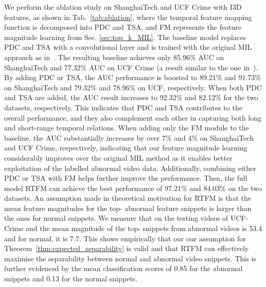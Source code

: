 \documentclass[final]{cvpr}
\begin{document}
We perform the ablation study on ShanghaiTech and UCF Crime with I3D features, as shown in Tab.~\ref{tab:ablation}, where the temporal feature mapping function  is decomposed into PDC and TSA, and FM represents the feature magnitude learning from Sec. \ref{sec:top_k_MIL}. 
The baseline model
replaces PDC and TSA with a  convolutional layer and is trained with the original MIL approach as in~\cite{sultani2018real}. The resulting baseline achieves only 85.96\% AUC on ShanghaiTech and 77.32\% AUC on UCF Crime (a result similar to the one in~\cite{sultani2018real}).
By adding PDC or TSA, the AUC performance is boosted to 89.21\% and 91.73\% on ShanghaiTech and 79.32\% and 78.96\% on UCF, respectively. When both PDC and TSA are added, the AUC result increases to 92.32\% and 82.12\% for the two datasets, respectively. This indicates that PDC and TSA contributes to the overall performance, and they also complement each other in capturing both long and short-range temporal relations.
When adding only the FM module to the baseline, the AUC substantially increases by over 7\% and 4\% on ShanghaiTech and UCF Crime, respectively, indicating that our feature magnitude learning considerably improves over the original MIL method as it enables better exploitation of the labelled abnormal video data. Additionally, combining either PDC or TSA with FM helps further improve the performance. Then, the full model RTFM can achieve the best performance of 97.21\% and 84.03\% on the two datasets.  
An assumption made in theoretical motivation for RTFM is that the mean feature magnitudes for the top- abnormal feature snippets is larger than the ones for normal snippets.
We measure that on the testing videos of UCF-Crime and the mean magnitude of the top- snippets from abnormal videos is 53.4 and for normal, it is 7.7. This shows empirically that our our assumption for Theorem~\ref{thm:expected_separability} is valid and that RTFM can effectively maximise the separability between normal and abnormal video snippets.  This is further evidenced by the mean classification scores of 0.85 for the abnormal snippets and 0.13 for the normal snippets.
\end{document}
